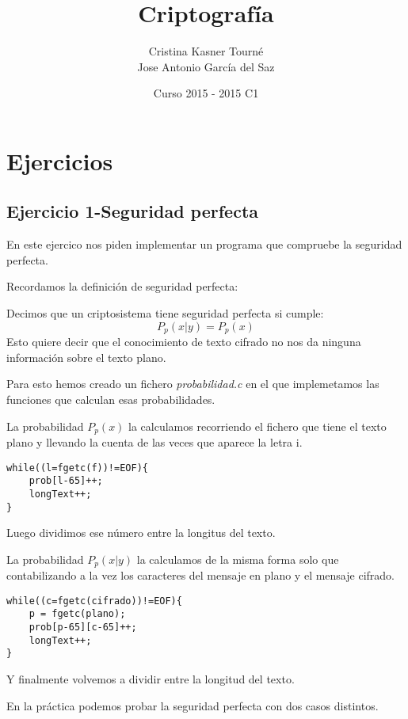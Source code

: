 \documentclass{apuntes}
\title{Criptografía}
\author{Cristina Kasner Tourné\\Jose Antonio García del Saz}
\date{Curso 2015 - 2015 C1}
\begin{document}
\pagestyle{plain}
\maketitle

\tableofcontents
\newpage
\appendix
\chapter{Ejercicios}
\section{Ejercicio 1-Seguridad perfecta}

En este ejercico nos piden implementar un programa que compruebe la seguridad perfecta.

Recordamos la definición de seguridad perfecta:

\begin{defn}
	Decimos que un criptosistema tiene seguridad perfecta si cumple:
	$$P_p(x|y) = P_p(x)$$
	Esto quiere decir que el conocimiento de texto cifrado no nos da ninguna información sobre el texto plano.
\end{defn}

Para esto hemos creado un fichero \textit{probabilidad.c} en el que implemetamos las funciones que calculan esas probabilidades.

La probabilidad $P_p(x)$ la calculamos recorriendo el fichero que tiene el texto plano y llevando la cuenta de las veces que aparece la letra i. 

\lstset{language=C, breaklines=true, basicstyle=\footnotesize}
\begin{lstlisting}
while((l=fgetc(f))!=EOF){
	prob[l-65]++;
	longText++;
}
\end{lstlisting}
Luego dividimos ese número entre la longitus del texto.

La probabilidad $P_p(x|y)$ la calculamos de la misma forma solo que contabilizando a la vez los caracteres del mensaje en plano y el mensaje cifrado.

\begin{lstlisting}
while((c=fgetc(cifrado))!=EOF){
	p = fgetc(plano);
	prob[p-65][c-65]++;
	longText++;
}
\end{lstlisting}

Y finalmente volvemos a dividir entre la longitud del texto.

En la práctica podemos probar la seguridad perfecta con dos casos distintos.
\end{document}
